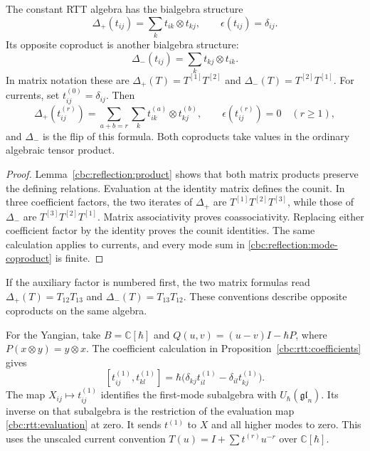 \begin{theorem}\label{cbc:reflection:coproduct}
The constant RTT algebra has the bialgebra structure
\[
 \Delta_+(t_{ij})=\sum_k t_{ik}\otimes t_{kj},\qquad
 \epsilon(t_{ij})=\delta_{ij}.
\]
Its opposite coproduct is another bialgebra structure:
\[
 \Delta_-(t_{ij})=\sum_k t_{kj}\otimes t_{ik}.
\]
In matrix notation these are
$\Delta_+(T)=T^{[1]}T^{[2]}$ and
$\Delta_-(T)=T^{[2]}T^{[1]}$.
For currents, set $t_{ij}^{(0)}=\delta_{ij}$.  Then
\begin{equation}\label{cbc:reflection:mode-coproduct}
 \Delta_+(t_{ij}^{(r)})
 =\sum_{a+b=r}\sum_k t_{ik}^{(a)}\otimes t_{kj}^{(b)},\qquad
 \epsilon(t_{ij}^{(r)})=0\quad(r\geq1),
\end{equation}
and $\Delta_-$ is the flip of this formula.
Both coproducts take values in the ordinary algebraic tensor product.
\end{theorem}
\begin{proof}
Lemma~\ref{cbc:reflection:product} shows that both matrix products preserve
the defining relations.  Evaluation at the identity matrix defines the
counit.  In three coefficient factors, the two iterates of $\Delta_+$
are $T^{[1]}T^{[2]}T^{[3]}$, while those of $\Delta_-$ are
$T^{[3]}T^{[2]}T^{[1]}$.
Matrix associativity proves coassociativity.
Replacing either coefficient factor by the identity proves the counit
identities.  The same calculation applies to currents, and every mode sum
in \eqref{cbc:reflection:mode-coproduct} is finite.
\end{proof}

If the auxiliary factor is numbered first, the two matrix formulas read
$\Delta_+(T)=T_{12}T_{13}$ and $\Delta_-(T)=T_{13}T_{12}$.
These conventions describe opposite coproducts on the same algebra.

For the Yangian, take $B=\mathbb C[\hbar]$ and
$Q(u,v)=(u-v)I-\hbar P$, where $P(x\otimes y)=y\otimes x$.
The coefficient calculation in Proposition~\ref{cbc:rtt:coefficients}
gives
\[
 [t_{ij}^{(1)},t_{kl}^{(1)}]
 =\hbar\bigl(\delta_{kj}t_{il}^{(1)}-\delta_{il}t_{kj}^{(1)}\bigr).
\]
The map $X_{ij}\mapsto t_{ij}^{(1)}$ identifies the first-mode subalgebra
with $U_\hbar(\mathfrak{gl}_n)$.
Its inverse on that subalgebra is the restriction of the evaluation map
\eqref{cbc:rtt:evaluation} at zero.  It sends $t^{(1)}$ to $X$ and all
higher modes to zero.  This uses the unscaled current convention
$T(u)=I+\sum t^{(r)}u^{-r}$ over $\mathbb C[\hbar]$.

